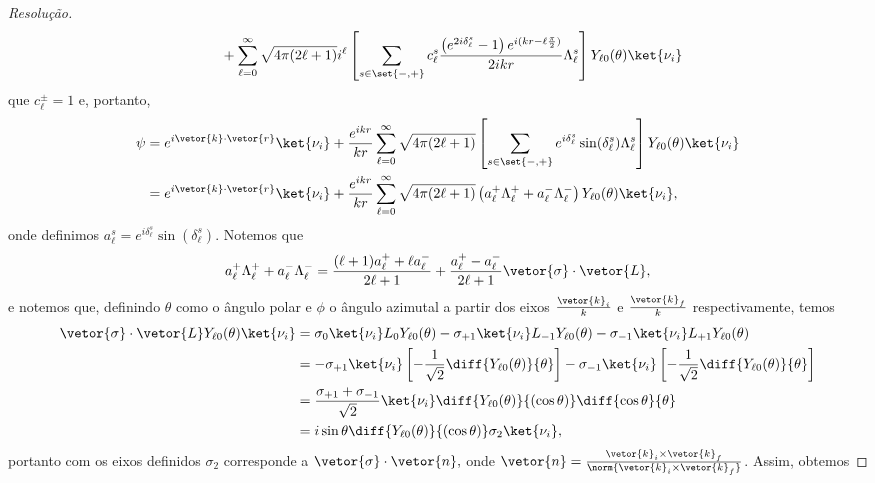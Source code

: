 \begin{proof}[Resolução]
\begin{align*}
           &{}\phantom{\mathop{\sim}^{r\to\infty} + } + \sum_{\ell = 0}^\infty \sqrt{4\pi(2\ell + 1)} i^{\ell} \left[\sum_{s \in\set{-,+}}c_\ell^s \frac{\left(e^{2i \delta_{\ell}^s} - 1\right)e^{i(kr - \ell \frac\pi2)}}{2ikr}\Lambda^s_\ell\right] Y_{\ell 0}(\theta) \ket{\nu_i}
   \end{align*}
   que \(c_\ell^{\pm} = 1\) e, portanto,
   \begin{align*}
      \psi &= e^{i \vetor{k}\cdot\vetor{r}} \ket{\nu_i} + \frac{e^{ikr}}{kr}\sum_{\ell = 0}^\infty \sqrt{4\pi(2\ell + 1)} \left[\sum_{s \in \set{-,+}} e^{i \delta_{\ell}^s}\sin(\delta_{\ell}^s) \Lambda_{\ell}^{s}\right] Y_{\ell 0}(\theta)\ket{\nu_i}\\
           &= e^{i \vetor{k}\cdot\vetor{r}} \ket{\nu_i} + \frac{e^{ikr}}{kr}\sum_{\ell = 0}^\infty \sqrt{4\pi(2\ell + 1)}  \left(a_{\ell}^+ \Lambda_\ell^+ + a_{\ell}^- \Lambda_\ell^-\right)Y_{\ell 0}(\theta)\ket{\nu_i},
   \end{align*}
   onde definimos \(a_{\ell}^s = e^{i \delta_{\ell}^s} \sin(\delta_{\ell}^{s}).\) Notemos que
   \begin{equation*}
      a_\ell^+ \Lambda_{\ell}^+ + a_{\ell}^- \Lambda_{\ell}^- = \frac{(\ell + 1)a_{\ell}^+ + \ell a_{\ell}^{-}}{2\ell + 1} + \frac{a_{\ell}^+ - a_{\ell}^{-}}{2\ell + 1} \vetor{\sigma}\cdot\vetor{L},
   \end{equation*}
   e notemos que, definindo \(\theta\) como o ângulo polar e \(\phi\) o ângulo azimutal a partir dos eixos \(\frac{\vetor{k}_i}{k}\) e \(\frac{\vetor{k}_f}{k}\) respectivamente, temos
   \begin{align*}
      \vetor{\sigma}\cdot \vetor{L} Y_{\ell 0}(\theta) \ket{\nu_i} 
      &= \sigma_0\ket{\nu_i} L_0 Y_{\ell 0}(\theta) - \sigma_{+1}\ket{\nu_i} L_{-1} Y_{\ell 0}(\theta) - \sigma_{-1}\ket{\nu_i} L_{+1}Y_{\ell 0}(\theta)\\
      &= - \sigma_{+1}\ket{\nu_i} \left[- \frac{1}{\sqrt{2}}\diff{Y_{\ell 0}(\theta)}{\theta}\right] - \sigma_{-1} \ket{\nu_i} \left[- \frac{1}{\sqrt{2}}\diff{Y_{\ell 0}(\theta)}{\theta}\right]\\
      &= \frac{\sigma_{+1} + \sigma_{-1}}{\sqrt{2}} \ket{\nu_i} \diff{Y_{\ell 0}(\theta)}{(\cos\theta)} \diff{\cos\theta}{\theta}\\
      &= i  \sin\theta\diff{Y_{\ell 0}(\theta)}{(\cos\theta)}\sigma_2 \ket{\nu_i},
   \end{align*}
   portanto com os eixos definidos \(\sigma_2\) corresponde a \(\vetor{\sigma} \cdot \vetor{n},\) onde \(\vetor{n} = \frac{\vetor{k}_i \times \vetor{k}_f}{\norm{\vetor{k}_i\times\vetor{k}_f}}\). Assim, obtemos

\end{proof}
